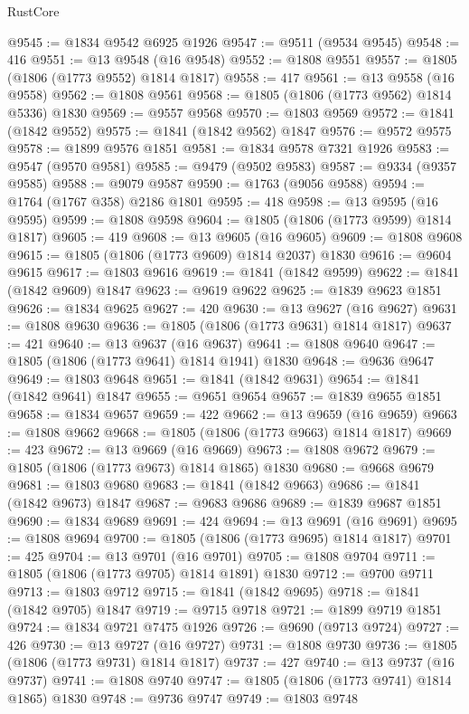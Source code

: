 \begin{lexlean}{RustCore}
\begin{coremodule}
@9545 := @1834 @9542 @6925 @1926
@9547 := @9511 (@9534 @9545)
@9548 := 416
@9551 := @13 @9548 (@16 @9548)
@9552 := @1808 @9551
@9557 := @1805 (@1806 (@1773 @9552) @1814 @1817)
@9558 := 417
@9561 := @13 @9558 (@16 @9558)
@9562 := @1808 @9561
@9568 := @1805 (@1806 (@1773 @9562) @1814 @5336) @1830
@9569 := @9557 @9568
@9570 := @1803 @9569
@9572 := @1841 (@1842 @9552)
@9575 := @1841 (@1842 @9562) @1847
@9576 := @9572 @9575
@9578 := @1899 @9576 @1851
@9581 := @1834 @9578 @7321 @1926
@9583 := @9547 (@9570 @9581)
@9585 := @9479 (@9502 @9583)
@9587 := @9334 (@9357 @9585)
@9588 := @9079 @9587
@9590 := @1763 (@9056 @9588)
@9594 := @1764 (@1767 @358) @2186 @1801
@9595 := 418
@9598 := @13 @9595 (@16 @9595)
@9599 := @1808 @9598
@9604 := @1805 (@1806 (@1773 @9599) @1814 @1817)
@9605 := 419
@9608 := @13 @9605 (@16 @9605)
@9609 := @1808 @9608
@9615 := @1805 (@1806 (@1773 @9609) @1814 @2037) @1830
@9616 := @9604 @9615
@9617 := @1803 @9616
@9619 := @1841 (@1842 @9599)
@9622 := @1841 (@1842 @9609) @1847
@9623 := @9619 @9622
@9625 := @1839 @9623 @1851
@9626 := @1834 @9625
@9627 := 420
@9630 := @13 @9627 (@16 @9627)
@9631 := @1808 @9630
@9636 := @1805 (@1806 (@1773 @9631) @1814 @1817)
@9637 := 421
@9640 := @13 @9637 (@16 @9637)
@9641 := @1808 @9640
@9647 := @1805 (@1806 (@1773 @9641) @1814 @1941) @1830
@9648 := @9636 @9647
@9649 := @1803 @9648
@9651 := @1841 (@1842 @9631)
@9654 := @1841 (@1842 @9641) @1847
@9655 := @9651 @9654
@9657 := @1839 @9655 @1851
@9658 := @1834 @9657
@9659 := 422
@9662 := @13 @9659 (@16 @9659)
@9663 := @1808 @9662
@9668 := @1805 (@1806 (@1773 @9663) @1814 @1817)
@9669 := 423
@9672 := @13 @9669 (@16 @9669)
@9673 := @1808 @9672
@9679 := @1805 (@1806 (@1773 @9673) @1814 @1865) @1830
@9680 := @9668 @9679
@9681 := @1803 @9680
@9683 := @1841 (@1842 @9663)
@9686 := @1841 (@1842 @9673) @1847
@9687 := @9683 @9686
@9689 := @1839 @9687 @1851
@9690 := @1834 @9689
@9691 := 424
@9694 := @13 @9691 (@16 @9691)
@9695 := @1808 @9694
@9700 := @1805 (@1806 (@1773 @9695) @1814 @1817)
@9701 := 425
@9704 := @13 @9701 (@16 @9701)
@9705 := @1808 @9704
@9711 := @1805 (@1806 (@1773 @9705) @1814 @1891) @1830
@9712 := @9700 @9711
@9713 := @1803 @9712
@9715 := @1841 (@1842 @9695)
@9718 := @1841 (@1842 @9705) @1847
@9719 := @9715 @9718
@9721 := @1899 @9719 @1851
@9724 := @1834 @9721 @7475 @1926
@9726 := @9690 (@9713 @9724)
@9727 := 426
@9730 := @13 @9727 (@16 @9727)
@9731 := @1808 @9730
@9736 := @1805 (@1806 (@1773 @9731) @1814 @1817)
@9737 := 427
@9740 := @13 @9737 (@16 @9737)
@9741 := @1808 @9740
@9747 := @1805 (@1806 (@1773 @9741) @1814 @1865) @1830
@9748 := @9736 @9747
@9749 := @1803 @9748

\end{coremodule}
\end{lexlean}
